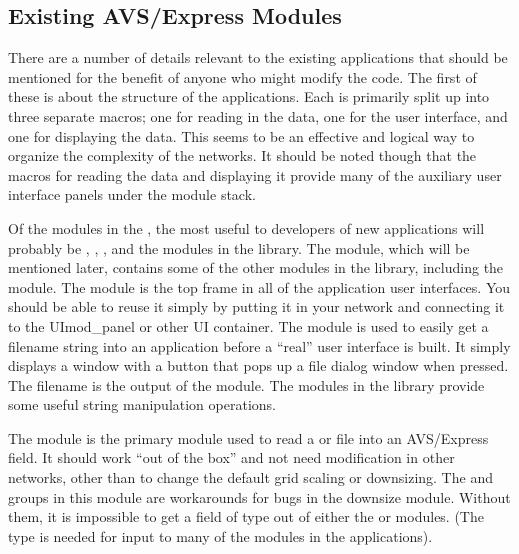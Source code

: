 \subsection{Existing AVS/Express Modules}
\label{Existing AVS/Express Modules}

There are a number of details relevant to the existing applications that
should be mentioned for the benefit of anyone who might modify the code.  The
first of these is about the structure of the applications.  Each is primarily
split up into three separate macros; one for reading in the data, one for the
user interface, and one for displaying the data.  This seems to be an
effective and logical way to organize the complexity of the networks.  It
should be noted though that the macros for reading the data and displaying it
provide many of the auxiliary user interface panels under the module stack.

Of the modules in the , the most useful to
developers of new applications will probably be ,
, , and the modules in the
 library.  The  module, which
will be mentioned later, contains some of the other modules in the library,
including the  module.  The  module
is the top frame in all of the application user interfaces.  You should be
able to reuse it simply by putting it in your network and connecting it to
the UImod\_panel or other UI container.  The  module
is used to easily get a filename string into an application before a ``real''
user interface is built.  It simply displays a window with a button that
pops up a file dialog window when pressed.  The filename is the output of the
module.  The modules in the  library provide some
useful string manipulation operations.

The  module
is the primary module used to read a  or  file
into an AVS/Express field.  It should work ``out of the box'' and not need
modification in other networks, other than to change the default grid scaling
or downsizing.  The  and  groups in this module
are workarounds for bugs in the downsize module.  Without them, it is
impossible to get a field of type  out of either the
 or  modules.  (The  type is
needed for input to many of the modules in the applications).

